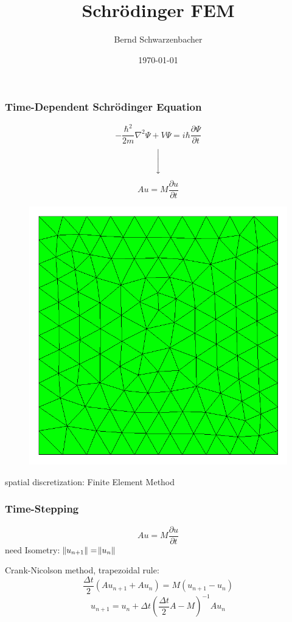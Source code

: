 \documentclass{beamer}
\title[Simulating the Schrödinger Equation with Finite Elements]{Schrödinger FEM}
\author{Bernd Schwarzenbacher}
\institute[KTH]
{Stockholm \\
\medskip
}
\date{\today}
\newcommand*{\Dt}{\Delta{}t}
\begin{document}
\begin{frame}
  \frametitle{Time-Dependent Schrödinger Equation}
\[ -\frac{\hbar^2}{2m} \nabla^2 \Psi + V \Psi = i \hbar \frac{\partial\Psi}{\partial{}t}\]
\pause
\[\Bigg\downarrow\]
\[A u = M \frac{\partial{}u}{\partial{}t}\]

\begin{figure}
  \vspace{-30pt}
\includegraphics[width=\linewidth]{mesh.png}
\end{figure}
spatial discretization: Finite Element Method 
\end{frame}

\begin{frame}
  \frametitle{Time-Stepping}
\[A u = M \frac{\partial{}u}{\partial{}t}\]
need Isometry: $\norm{u_{n+1}} = \norm{u_n}$

Crank-Nicolson method, trapezoidal rule:
\[ \frac{\Dt}{2} (A u_{n+1} + A u_{n}) = M (u_{n+1} - u_n) \]
\pause
\[ u_{n+1} =  u_n +  \Dt \left( \frac{\Dt}{2}A - M \right)^{-1} A u_n\]
\end{frame}
\end{document}
